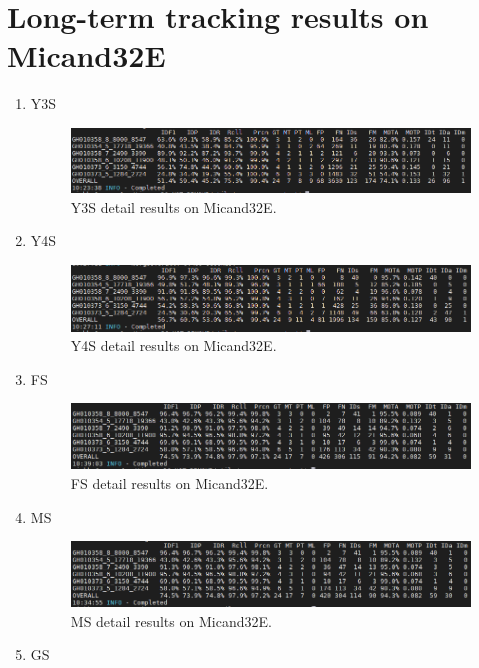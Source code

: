 \section{Long-term tracking results on Micand32E}
\begin{enumerate}
	\item Y3S
	\begin{figure}
		\centerline{\includegraphics[width=1\linewidth]{Figs/Evaluation/micand6/y3s.png}}
		\caption{Y3S detail results on Micand32E.}
	\end{figure}
	\item Y4S
	\begin{figure}
		\centerline{\includegraphics[width=1\linewidth]{Figs/Evaluation/micand6/y4s.png}}
		\caption{Y4S detail results on Micand32E.}
	\end{figure}
	\item FS
	\begin{figure}
		\centerline{\includegraphics[width=1\linewidth]{Figs/Evaluation/micand6/fs.png}}
		\caption{FS detail results on Micand32E.}
	\end{figure}
	\item MS
	\begin{figure}
		\centerline{\includegraphics[width=1\linewidth]{Figs/Evaluation/micand6/ms.png}}
		\caption{MS detail results on Micand32E.}
	\end{figure}
	\item GS
	\begin{figure}

\end{figure}
\end{enumerate}
